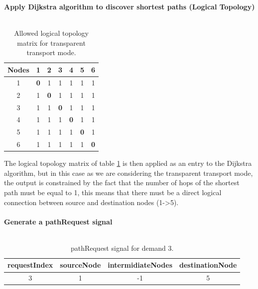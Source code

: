\textbf{Apply Dijkstra algorithm to discover shortest paths (Logical Topology)}\\ \\
\begin{table}[H]
	\centering	
	\begin{tabular}{|c|c|c|c|c|c|c|}
		\hline
		\multicolumn{1}{|l|}{\textbf{Nodes}} & 1   & 2   & 3   & 4   & 5   & 6  \\ \hline
		1                           & \textbf{0}   & 1 & 1 & 1 & 1 & 1 \\ \hline
		2                           & 1 & \textbf{0}   & 1 & 1 & 1 & 1 \\ \hline
		3                           & 1 & 1 & \textbf{0}   & 1 & 1 & 1 \\ \hline
		4                           & 1 & 1 & 1 & \textbf{0}   & 1 & 1 \\ \hline
		5                           & 1 & 1 & 1 & 1 & \textbf{0}   & 1 \\ \hline
		6                           & 1 & 1 & 1 & 1 & 1 & \textbf{0}   \\ \hline
	\end{tabular}
	\caption{Allowed logical topology matrix for transparent transport mode.}
	\label{Transparentlogical_topology}
\end{table}

The logical topology matrix of table \ref{Transparentlogical_topology} is then applied as an entry to the Dijkstra algorithm, but in this case as we are considering the transparent transport mode, the output is constrained by the fact that the number of hops of the shortest path must be equal to 1, this means that there must be a direct logical connection between source and destination nodes (1->5).\\ \\

\textbf{Generate a pathRequest signal}\\ \\

\begin{table}[H]
	\centering
	\begin{tabular}{|c|c|c|c|}
		\hline
		requestIndex & sourceNode & intermidiateNodes & destinationNode \\ \hline
		3            & 1          & -1                 & 5               \\ \hline
	\end{tabular}
	\caption{pathRequest signal for demand 3.}
\end{table} 

